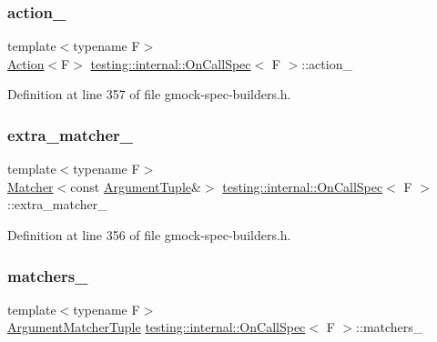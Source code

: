 \subsubsection{\texorpdfstring{action\+\_\+}{action\_}}
{\footnotesize\ttfamily template$<$typename F$>$ \\
\hyperlink{classtesting_1_1Action}{Action}$<$F$>$ \hyperlink{classtesting_1_1internal_1_1OnCallSpec}{testing\+::internal\+::\+On\+Call\+Spec}$<$ F $>$\+::action\+\_\+\hspace{0.3cm}{\ttfamily [private]}}



Definition at line 357 of file gmock-\/spec-\/builders.\+h.

\mbox{\label{classtesting_1_1internal_1_1OnCallSpec_ab9c4a32626e40be4b40824815128f099}} 
\subsubsection{\texorpdfstring{extra\+\_\+matcher\+\_\+}{extra\_matcher\_}}
{\footnotesize\ttfamily template$<$typename F$>$ \\
\hyperlink{classtesting_1_1Matcher}{Matcher}$<$const \hyperlink{classtesting_1_1internal_1_1OnCallSpec_a70ffab8b915b7b48a90f5ce256da806f}{Argument\+Tuple}\&$>$ \hyperlink{classtesting_1_1internal_1_1OnCallSpec}{testing\+::internal\+::\+On\+Call\+Spec}$<$ F $>$\+::extra\+\_\+matcher\+\_\+\hspace{0.3cm}{\ttfamily [private]}}



Definition at line 356 of file gmock-\/spec-\/builders.\+h.

\mbox{\label{classtesting_1_1internal_1_1OnCallSpec_a3938ebe6cb9bc385956358e354a67673}} 
\subsubsection{\texorpdfstring{matchers\+\_\+}{matchers\_}}
{\footnotesize\ttfamily template$<$typename F$>$ \\
\hyperlink{classtesting_1_1internal_1_1OnCallSpec_a3240f159f0a9d8cda208bc256da35074}{Argument\+Matcher\+Tuple} \hyperlink{classtesting_1_1internal_1_1OnCallSpec}{testing\+::internal\+::\+On\+Call\+Spec}$<$ F $>$\+::matchers\+\_\+\hspace{0.3cm}{\ttfamily [private]}}



